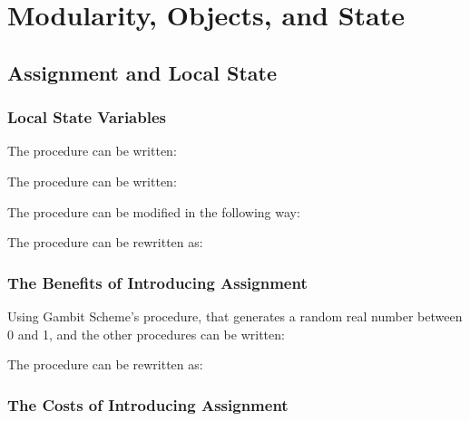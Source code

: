 \chapter{Modularity, Objects, and State}

\section{Assignment and Local State}

\subsection{Local State Variables}

\begin{exe}[3.1]
    The procedure  can be written:
\end{exe}

\begin{exe}[3.2]
    The  procedure can be written:
\end{exe}

\begin{exe}[3.3]
    The  procedure can be modified in the following way:
\end{exe}

\begin{exe}[3.4]
    The procedure can be rewritten as:
\end{exe}

\subsection{The Benefits of Introducing Assignment}

\begin{exe}[3.5]
    Using Gambit Scheme’s  procedure, that generates a random 
    real number between 0 and 1,  and the other procedures 
    can be written:
\end{exe}

\begin{exe}[3.6]
    The  procedure can be rewritten as:
\end{exe}

\subsection{The Costs of Introducing Assignment}

